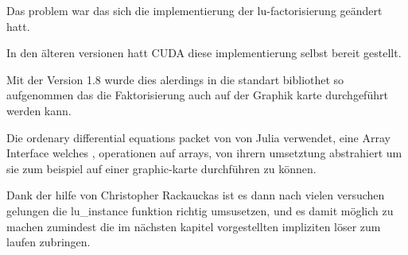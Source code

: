 Das problem war das sich die implementierung der lu-factorisierung geändert hatt.

In den älteren versionen hatt CUDA diese implementierung selbst bereit gestellt.

Mit der Version 1.8 wurde dies alerdings in die standart bibliothet so aufgenommen das die Faktorisierung 
auch auf der Graphik karte durchgeführt werden kann.

Die ordenary differential equations packet von von Julia verwendet, eine Array Interface welches , operationen auf arrays, von ihrern umsetztung abstrahiert um sie zum beispiel auf einer graphic-karte durchführen zu können.

Dank der hilfe von Christopher Rackauckas ist es dann nach vielen versuchen gelungen die lu\_instance funktion richtig umsusetzen, und es damit möglich zu machen zumindest die im nächsten kapitel vorgestellten impliziten löser zum laufen zubringen.













